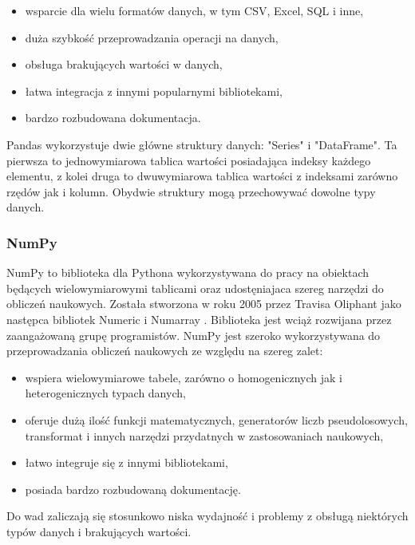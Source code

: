 \documentclass[12pt,twoside]{article}
\begin{document}
\begin{itemize}[label=-,labelsep=0.4cm, leftmargin=1.25cm]
    \item wsparcie dla wielu formatów danych, w tym CSV, Excel, SQL i inne,
    \item duża szybkość przeprowadzania operacji na danych,
    \item obsługa brakujących wartości w danych,
    \item łatwa integracja z innymi popularnymi bibliotekami,
    \item bardzo rozbudowana dokumentacja.
\end{itemize}

Pandas wykorzystuje dwie główne struktury danych: "Series" i "DataFrame".
Ta pierwsza to jednowymiarowa tablica wartości posiadająca indeksy każdego elementu,
z kolei druga to dwuwymiarowa tablica wartości z indeksami zarówno rzędów jak i kolumn.
Obydwie struktury mogą przechowywać dowolne typy danych. \cite{pandas}

\subsubsection{NumPy}

NumPy to biblioteka dla Pythona wykorzystywana do pracy na obiektach będących wielowymiarowymi tablicami
oraz udostęniajaca szereg narzędzi do obliczeń naukowych. Została stworzona w roku 2005 przez Travisa Oliphant
jako następca bibliotek Numeric \cite{numeric} i Numarray \cite{numarray}. Biblioteka jest wciąż rozwijana przez zaangażowaną grupę programistów.
NumPy jest szeroko wykorzystywana do przeprowadzania obliczeń naukowych ze względu na szereg zalet:

\begin{itemize}[label=-,labelsep=0.4cm, leftmargin=1.25cm]
    \item wspiera wielowymiarowe tabele, zarówno o homogenicznych jak i heterogenicznych typach danych,
    \item oferuje dużą ilość funkcji matematycznych, generatorów liczb pseudolosowych, transformat i innych narzędzi
    przydatnych w zastosowaniach naukowych,
    \item łatwo integruje się z innymi bibliotekami,
    \item posiada bardzo rozbudowaną dokumentację.
\end{itemize}

Do wad zaliczają się stosunkowo niska wydajność i problemy z obsługą niektórych typów danych i brakujących wartości. \cite{numpy}
\end{document}
